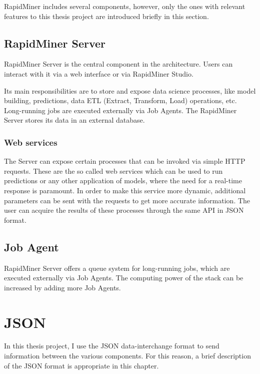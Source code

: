 RapidMiner includes several components, however, only the ones with relevant features to this thesis project are introduced briefly in this section.

\subsection{RapidMiner Server}

RapidMiner Server is the central component in the architecture. Users can interact with it via a web interface or via RapidMiner Studio.

Its main responsibilities are to store and expose data science processes, like model building, predictions, data ETL (Extract, Transform, Load) operations, etc. Long-running jobs are executed externally via Job Agents. The RapidMiner Server stores its data in an external database.

\subsubsection{Web services}
The Server can expose certain processes that can be invoked via simple HTTP requests. These are the so called web services which can be used to run predictions or any other application of models, where the need for a real-time response is paramount. In order to make this service more dynamic, additional parameters can be sent with the requests to get more accurate information. The user can acquire the results of these processes through the same API in JSON format.

\subsection{Job Agent}

RapidMiner Server offers a queue system for long-running jobs, which are executed externally via Job Agents. The computing power of the stack can be increased by adding more Job Agents.

\section{JSON}


In this thesis project, I use the JSON data-interchange format to send information between the various components. For this reason, a brief description of the JSON format is appropriate in this chapter.

